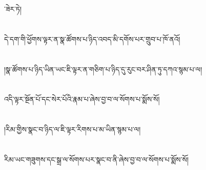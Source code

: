་ཟེར་ཏེ།\chapter{ }དེ་དག་གི་ཕྱོགས་ལྟར་ན་སྣ་ཚོགས་པ་ཉིད་འབད་མི་དགོས་པར་གྲུབ་པ་ཁོ་ནའོ།\chapter{ }།སྣ་ཚོགས་པ་ཉིད་ཡིན་ཡང་ཇི་ལྟར་ན་གཅིག་པ་ཉིད་དུ་རུང་བར་ཤིན་ཏུ་དཀའ་སྙམ་པ་ལ།\chapter{ }འདི་ལྟར་སྔོན་པོ་དང་སེར་པོའི་རྣམ་པ་ཞེས་བྱ་བ་ལ་སོགས་པ་སྨོས་སོ།\chapter{ }།རིམ་གྱིས་སྣང་བ་ཉིད་ལ་ཇི་ལྟར་རིགས་པ་མ་ཡིན་སྙམ་པ་ལ།\chapter{ }རིམ་ཡང་གཟུགས་དང་སྒྲ་ལ་སོགས་པར་སྣང་བ་ནི་ཞེས་བྱ་བ་ལ་སོགས་པ་སྨོས་སོ།\ch